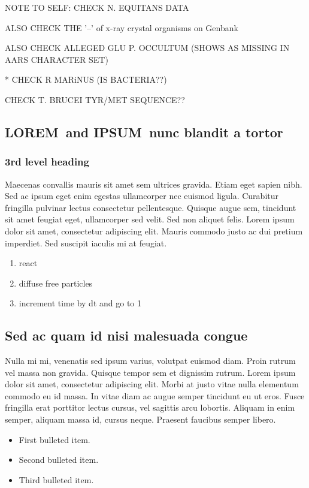 \documentclass[10pt,letterpaper]{article}
\newcommand{\lorem}{{\bf LOREM}}
\newcommand{\ipsum}{{\bf IPSUM}}
\begin{document}
NOTE TO SELF: CHECK N. EQUITANS DATA

ALSO CHECK THE '--' of x-ray crystal organisms on Genbank

ALSO CHECK ALLEGED GLU P. OCCULTUM (SHOWS AS MISSING IN AARS CHARACTER SET)

* CHECK R MARiNUS (IS BACTERIA??)

CHECK T. BRUCEI TYR/MET SEQUENCE??

\subsection*{\lorem\ and \ipsum\ nunc blandit a tortor}
\subsubsection*{3rd level heading} 
Maecenas convallis mauris sit amet sem ultrices gravida. Etiam eget sapien nibh. Sed ac ipsum eget enim egestas ullamcorper nec euismod ligula. Curabitur fringilla pulvinar lectus consectetur pellentesque. Quisque augue sem, tincidunt sit amet feugiat eget, ullamcorper sed velit. Sed non aliquet felis. Lorem ipsum dolor sit amet, consectetur adipiscing elit. Mauris commodo justo ac dui pretium imperdiet. Sed suscipit iaculis mi at feugiat. 

\begin{enumerate}
	\item{react}
	\item{diffuse free particles}
	\item{increment time by dt and go to 1}
\end{enumerate}


\subsection*{Sed ac quam id nisi malesuada congue}

Nulla mi mi, venenatis sed ipsum varius, volutpat euismod diam. Proin rutrum vel massa non gravida. Quisque tempor sem et dignissim rutrum. Lorem ipsum dolor sit amet, consectetur adipiscing elit. Morbi at justo vitae nulla elementum commodo eu id massa. In vitae diam ac augue semper tincidunt eu ut eros. Fusce fringilla erat porttitor lectus cursus, vel sagittis arcu lobortis. Aliquam in enim semper, aliquam massa id, cursus neque. Praesent faucibus semper libero.

\begin{itemize}
	\item First bulleted item.
	\item Second bulleted item.
	\item Third bulleted item.
\end{itemize}
\end{document}
